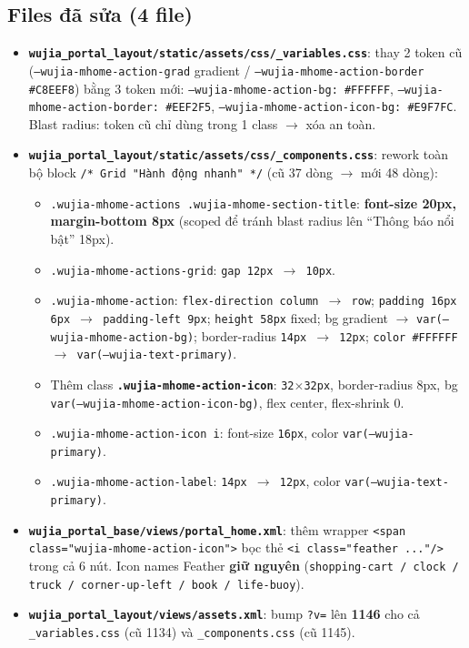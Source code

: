 \subsection{Files đã sửa (4 file)}

\begin{itemize}
  \item \textbf{\texttt{wujia\_portal\_layout/static/assets/css/\_variables.css}}: thay 2 token cũ
    (\texttt{--wujia-mhome-action-grad} gradient / \texttt{--wujia-mhome-action-border \#C8EEF8})
    bằng 3 token mới: \texttt{--wujia-mhome-action-bg: \#FFFFFF},
    \texttt{--wujia-mhome-action-border: \#EEF2F5},
    \texttt{--wujia-mhome-action-icon-bg: \#E9F7FC}. Blast radius: token cũ chỉ dùng trong 1 class $\rightarrow$ xóa an toàn.

  \item \textbf{\texttt{wujia\_portal\_layout/static/assets/css/\_components.css}}: rework toàn bộ block
    \texttt{/* Grid "Hành động nhanh" */} (cũ 37 dòng $\rightarrow$ mới 48 dòng):
    \begin{itemize}
      \item \texttt{.wujia-mhome-actions .wujia-mhome-section-title}: \textbf{font-size 20px, margin-bottom 8px}
        (scoped để tránh blast radius lên ``Thông báo nổi bật'' 18px).
      \item \texttt{.wujia-mhome-actions-grid}: \texttt{gap 12px $\rightarrow$ 10px}.
      \item \texttt{.wujia-mhome-action}: \texttt{flex-direction column $\rightarrow$ row};
        \texttt{padding 16px 6px $\rightarrow$ padding-left 9px}; \texttt{height 58px} fixed;
        bg gradient $\rightarrow$ \texttt{var(--wujia-mhome-action-bg)};
        border-radius \texttt{14px $\rightarrow$ 12px}; \texttt{color \#FFFFFF $\rightarrow$ var(--wujia-text-primary)}.
      \item Thêm class \textbf{\texttt{.wujia-mhome-action-icon}}: \texttt{32$\times$32px}, border-radius 8px,
        bg \texttt{var(--wujia-mhome-action-icon-bg)}, flex center, flex-shrink 0.
      \item \texttt{.wujia-mhome-action-icon i}: font-size \texttt{16px}, color \texttt{var(--wujia-primary)}.
      \item \texttt{.wujia-mhome-action-label}: \texttt{14px $\rightarrow$ 12px}, color \texttt{var(--wujia-text-primary)}.
    \end{itemize}

  \item \textbf{\texttt{wujia\_portal\_base/views/portal\_home.xml}}: thêm wrapper
    \texttt{<span class="wujia-mhome-action-icon">} bọc thẻ \texttt{<i class="feather ..."/>}
    trong cả 6 nút. Icon names Feather \textbf{giữ nguyên}
    (\texttt{shopping-cart / clock / truck / corner-up-left / book / life-buoy}).

  \item \textbf{\texttt{wujia\_portal\_layout/views/assets.xml}}: bump \texttt{?v=} lên \textbf{1146}
    cho cả \texttt{\_variables.css} (cũ 1134) và \texttt{\_components.css} (cũ 1145).
\end{itemize}

